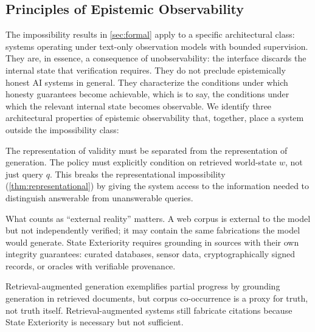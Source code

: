 



\subsection{Principles of Epistemic Observability}

The impossibility results in \autoref{sec:formal} apply to a specific
architectural class: systems operating under text-only observation models with
bounded supervision. They are, in essence, a consequence of unobservability:
the interface discards the internal state that verification requires. They do
not preclude epistemically honest AI systems in general. They characterize the
conditions under which honesty guarantees become achievable, which is to say,
the conditions under which the relevant internal state becomes observable.
We identify three architectural properties of epistemic observability that, together, place a system
outside the impossibility class:

\begin{principle}
The representation of validity must be separated from the representation of
generation. The policy must explicitly condition on retrieved world-state $w$,
not just query $q$. This breaks the representational impossibility
(\autoref{thm:representational}) by giving the system access to the
information needed to distinguish answerable from unanswerable queries.
\end{principle}

What counts as ``external reality'' matters. A web corpus is external to the
model but not independently verified; it may contain the same fabrications the
model would generate. State Exteriority requires grounding in sources with their
own integrity guarantees: curated databases, sensor data, cryptographically
signed records, or oracles with verifiable provenance.

Retrieval-augmented generation exemplifies partial progress by grounding
generation in retrieved documents, but corpus co-occurrence is a proxy for
truth, not truth itself. Retrieval-augmented systems still fabricate
citations because State Exteriority is necessary but not sufficient.

